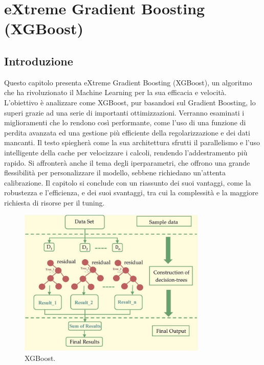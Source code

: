 \documentclass[a4paper,12pt]{report}
\begin{document}
	\chapter{eXtreme Gradient Boosting (XGBoost)}
	
	\section{Introduzione}
	Questo capitolo presenta eXtreme Gradient Boosting (XGBoost), un algoritmo che ha rivoluzionato il Machine Learning per la sua efficacia e velocità. L'obiettivo è analizzare come XGBoost, pur basandosi sul Gradient Boosting, lo superi grazie ad una serie di importanti ottimizzazioni. Verranno esaminati i miglioramenti che lo rendono così performante, come l'uso di una funzione di perdita avanzata ed una gestione più efficiente della regolarizzazione e dei dati mancanti. Il testo spiegherà come la sua architettura sfrutti il parallelismo e l'uso intelligente della cache per velocizzare i calcoli, rendendo l'addestramento più rapido. Si affronterà anche il tema degli iperparametri, che offrono una grande flessibilità per personalizzare il modello, sebbene richiedano un'attenta calibrazione. Il capitolo si conclude con un riassunto dei suoi vantaggi, come la robustezza e l'efficienza, e dei suoi svantaggi, tra cui la complessità e la maggiore richiesta di risorse per il tuning.
	
	\begin{figure}[H]
		\centering
		\includegraphics[width=0.8\textwidth]{img/xgb.png}
		\caption{XGBoost.}
	\end{figure}
	
\end{document}
